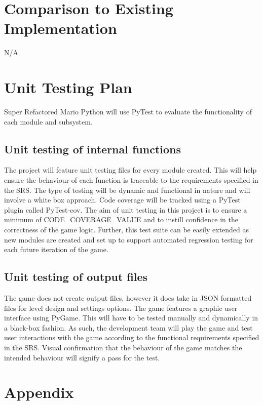 \documentclass[12pt, titlepage]{article}
\begin{document}
	

\section{Comparison to Existing Implementation}	
N/A



\section{Unit Testing Plan}
Super Refactored Mario Python will use PyTest to evaluate the functionality of each module and subsystem.	
\subsection{Unit testing of internal functions}
	The project will feature unit testing files for every module created. This will help ensure the behaviour of each function is traceable to the requirements specified in the SRS. The type of testing will be dynamic and functional in nature and will involve a white box approach. Code coverage will be tracked using a PyTest plugin called PyTest-cov. The aim of unit testing in this project is to ensure a minimum of CODE\_COVERAGE\_VALUE and to instill confidence in the correctness of the game logic. Further, this test suite can be easily extended as new modules are created and set up to support automated regression testing for each future iteration of the game.	
\subsection{Unit testing of output files}		
    The game does not create output files, however it does take in JSON formatted files for level design and settings options. The game features a graphic user interface using PyGame. This will have to be tested manually and dynamically in a black-box fashion. As such, the development team will play the game and test user interactions with the game according to the functional requirements specified in the SRS. Visual confirmation that the behaviour of the game matches the intended behaviour will signify a pass for the test.




\newpage

\section{Appendix}
\end{document}
